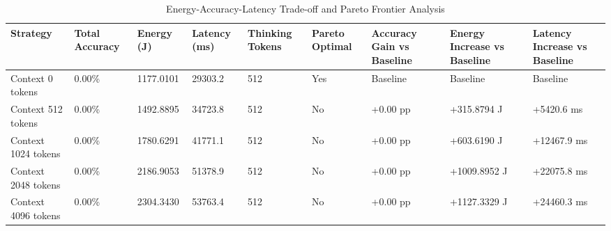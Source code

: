 \begin{table}
\caption{Energy-Accuracy-Latency Trade-off and Pareto Frontier Analysis}
\label{tab:tradeoff_comparison}
\begin{tabular}{lllllllll}
\toprule
Strategy & Total Accuracy & Energy (J) & Latency (ms) & Thinking Tokens & Pareto Optimal & Accuracy Gain vs Baseline & Energy Increase vs Baseline & Latency Increase vs Baseline \\
\midrule
Context 0 tokens & 0.00\% & 1177.0101 & 29303.2 & 512 & Yes & Baseline & Baseline & Baseline \\
Context 512 tokens & 0.00\% & 1492.8895 & 34723.8 & 512 & No & +0.00 pp & +315.8794 J & +5420.6 ms \\
Context 1024 tokens & 0.00\% & 1780.6291 & 41771.1 & 512 & No & +0.00 pp & +603.6190 J & +12467.9 ms \\
Context 2048 tokens & 0.00\% & 2186.9053 & 51378.9 & 512 & No & +0.00 pp & +1009.8952 J & +22075.8 ms \\
Context 4096 tokens & 0.00\% & 2304.3430 & 53763.4 & 512 & No & +0.00 pp & +1127.3329 J & +24460.3 ms \\
\bottomrule
\end{tabular}
\end{table}
